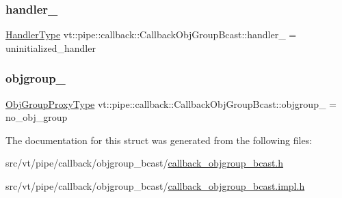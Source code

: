 \subsubsection{\texorpdfstring{handler\+\_\+}{handler\_}}
{\footnotesize\ttfamily \hyperlink{namespacevt_af64846b57dfcaf104da3ef6967917573}{Handler\+Type} vt\+::pipe\+::callback\+::\+Callback\+Obj\+Group\+Bcast\+::handler\+\_\+ = uninitialized\+\_\+handler\hspace{0.3cm}{\ttfamily [private]}}

\mbox{\label{structvt_1_1pipe_1_1callback_1_1_callback_obj_group_bcast_a69a866eae9abf12ca0b60c9158c82a20}} 
\subsubsection{\texorpdfstring{objgroup\+\_\+}{objgroup\_}}
{\footnotesize\ttfamily \hyperlink{namespacevt_ad7cae989df485fccca57f0792a880a8e}{Obj\+Group\+Proxy\+Type} vt\+::pipe\+::callback\+::\+Callback\+Obj\+Group\+Bcast\+::objgroup\+\_\+ = no\+\_\+obj\+\_\+group\hspace{0.3cm}{\ttfamily [private]}}



The documentation for this struct was generated from the following files\+:\begin{DoxyCompactItemize}
\item 
src/vt/pipe/callback/objgroup\+\_\+bcast/\hyperlink{callback__objgroup__bcast_8h}{callback\+\_\+objgroup\+\_\+bcast.\+h}\item 
src/vt/pipe/callback/objgroup\+\_\+bcast/\hyperlink{callback__objgroup__bcast_8impl_8h}{callback\+\_\+objgroup\+\_\+bcast.\+impl.\+h}\end{DoxyCompactItemize}

